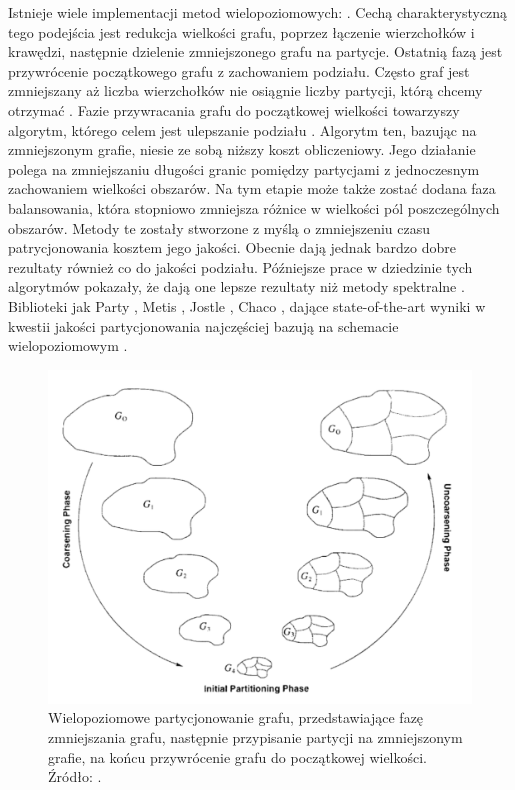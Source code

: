 Istnieje wiele implementacji metod wielopoziomowych: \cite{metis, jostle, Bui1993AHF, 103500, 185177, 279334, inproceedings, 129970, 10.1145/165939.165942}.
Cechą charakterystyczną tego podejścia jest redukcja
wielkości grafu, poprzez łączenie wierzchołków i krawędzi, następnie dzielenie zmniejszonego grafu na partycje.
Ostatnią fazą jest przywrócenie początkowego grafu z zachowaniem podziału.
Często graf jest zmniejszany aż liczba wierzchołków nie osiągnie
liczby partycji, którą chcemy otrzymać \cite{1364754}.
Fazie przywracania grafu do początkowej wielkości towarzyszy
algorytm, którego celem jest ulepszanie podziału \cite{article, 10.5555/800263.809204}.
Algorytm ten, bazując na zmniejszonym
grafie, niesie ze sobą niższy koszt obliczeniowy.
Jego działanie polega na zmniejszaniu długości granic pomiędzy partycjami z jednoczesnym zachowaniem wielkości obszarów.
Na tym etapie może także zostać dodana faza balansowania, która stopniowo zmniejsza różnice w wielkości pól
poszczególnych obszarów.
Metody te zostały stworzone z myślą o zmniejszeniu czasu patrycjonowania kosztem jego jakości.
Obecnie dają jednak bardzo dobre rezultaty również co do jakości podziału.
Późniejsze prace w dziedzinie tych algorytmów pokazały, że dają one lepsze rezultaty niż metody spektralne \cite{metis}.
Biblioteki jak Party \cite{1364754}, Metis \cite{metis}, Jostle \cite{jostle}, Chaco \cite{inproceedings},
dające state-of-the-art wyniki w kwestii jakości partycjonowania najczęściej bazują na schemacie wielopoziomowym
\cite{inproceedings}.

\begin{figure}[h]
    \centering
    \includegraphics[width=0.9\linewidth]{images/coarsening}
    \caption{Wielopoziomowe partycjonowanie grafu, przedstawiające fazę zmniejszania grafu, następnie przypisanie
    partycji na zmniejszonym grafie, na końcu przywrócenie grafu do początkowej wielkości.
    Źródło: \cite{KARYPIS199896}.}
    \label{im:multilevel_partitioning}
\end{figure}


